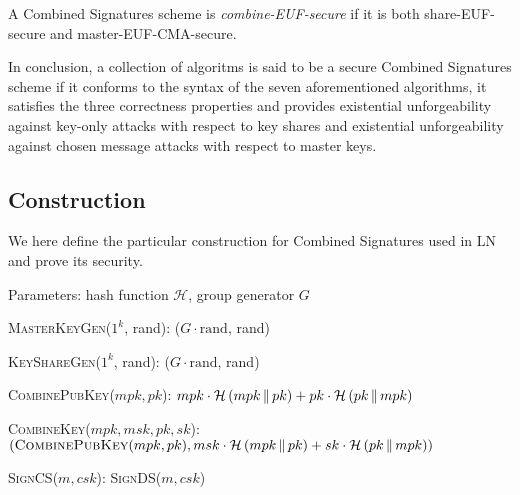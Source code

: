   \begin{definition}
    A Combined Signatures scheme is \emph{\textsf{combine-EUF}-secure} if it
    is both \textsf{share-EUF}-secure and \textsf{master-EUF-CMA}-secure.
  \end{definition}

  In conclusion, a collection of algoritms is said to be a secure Combined
  Signatures scheme if it conforms to the syntax of the seven aforementioned
  algorithms, it satisfies the three correctness properties and provides
  existential unforgeability against key-only attacks with respect to key shares
  and existential unforgeability against chosen message attacks with respect to
  master keys.

  \subsection{Construction}
    We here define the particular construction for Combined Signatures used in
    LN and prove its security.

    Parameters: hash function $\mathcal{H}$, group generator $G$
    \begin{algorithmic}[0]
      \State \textsc{MasterKeyGen}($1^k$, rand):
      \Indent
        \State \Return ($G \cdot \mathrm{rand}$, rand)
      \EndIndent
    \end{algorithmic}

    \begin{algorithmic}[0]
      \State \textsc{KeyShareGen}($1^k$, rand):
      \Indent
        \State \Return ($G \cdot \mathrm{rand}$, rand)
      \EndIndent
    \end{algorithmic}

    \begin{algorithmic}[0]
      \State \textsc{CombinePubKey}($mpk, pk$):
      \Indent
        \State \Return $mpk \cdot \mathcal{H}\left(mpk \,\|\, pk\right) + pk
        \cdot \mathcal{H}\left(pk \,\|\, mpk\right)$
      \EndIndent
    \end{algorithmic}

    \begin{algorithmic}[0]
      \State \textsc{CombineKey}($mpk, msk, pk, sk$):
      \Indent
        \State \Return $(\textsc{CombinePubKey}(mpk, pk), msk \cdot
        \mathcal{H}\left(mpk \,\|\, pk\right) + sk \cdot \mathcal{H}\left(pk
        \,\|\, mpk\right))$
      \EndIndent
    \end{algorithmic}

    \begin{algorithmic}[0]
      \State \textsc{SignCS}($m, csk$):
      \Indent
        \State \Return \textsc{SignDS}($m, csk$)
      \EndIndent
    \end{algorithmic}

